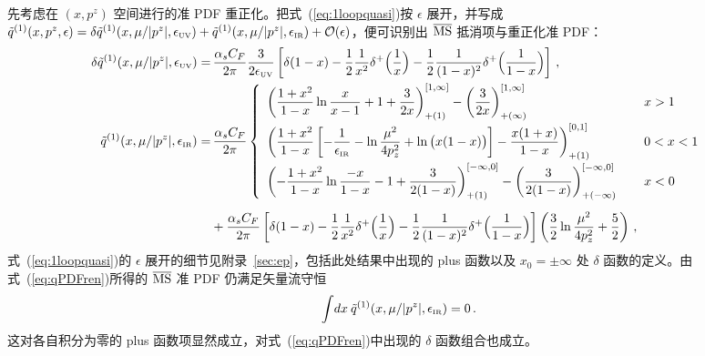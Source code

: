 \begin{widetext}
先考虑在 $(x,p^z)$ 空间进行的准 PDF 重正化。把式~(\ref{eq:1loopquasi})按 $\epsilon$ 展开，并写成 $\tilde{q}^{(1)}(x,p^z,\epsilon) =\delta \tilde{q}^{(1)}(x,\mu/|p^z|,\epsilon_{\mbox{\tiny UV}})+\tilde{q}^{(1)}(x,\mu/|p^z|,\epsilon_{\mbox{\tiny IR}}) +{\cal O}(\epsilon)$，便可识别出 $\overline{\rm MS}$ 抵消项与重正化准 PDF：
\begin{align}\label{eq:qPDFren}
\delta \tilde{q}^{(1)}(x,\mu/|p^z|,\epsilon_{\mbox{\tiny UV}})
=&\,  {\alpha_sC_F\over 2\pi} {3\over 2\epsilon_{\mbox{\tiny UV}}}
 \left[\delta(1-x) - {1\over2}{1\over x^2}\delta^+\Big({1\over x}\Big) - {1\over2}{1\over (1-x)^2}\delta^+\Big({1\over 1-x}\Big) \right]
 \,, \\
\tilde{q}^{(1)}(x,\mu/|p^z|,\epsilon_{\mbox{\tiny IR}})
=&\, {\alpha_sC_F\over 2\pi}\left\{
\begin{array}{ll}
\displaystyle \left({1+x^2\over 1-x}\ln {x\over x-1} + 1 + {3\over 2x}\right)^{[1,\infty]}_{+(1)}- \left({3\over 2x}\right)^{[1,\infty]}_{+(\infty)} &\, x>1\\[10pt]
\displaystyle \left({1+x^2\over 1-x}\left[- {1\over \epsilon_{\mbox{\tiny IR}}} - \ln{\mu^2\over 4p_z^2} + \ln\big(x(1-x)\big)\right] - {x(1+x)\over 1-x}\right)^{[0,1]}_{+(1)}  &\, 0<x<1\\[10pt]
\displaystyle  \left(-{1+x^2\over 1-x}\ln {-x\over 1-x} - 1 + {3\over 2(1-x)}\right)^{[-\infty,0]}_{+(1)} - \left({3\over 2(1-x)}\right)^{[-\infty,0]}_{+(-\infty)} \quad &\, x<0
\end{array}\right.\nonumber\\[5pt]
& + {\alpha_sC_F\over 2\pi}\left[\delta(1-x) - {1\over2}{1\over x^2}\delta^+\Big({1\over x}\Big) - {1\over2}{1\over (1-x)^2}\delta^+\Big({1\over 1-x}\Big) \right] \left( {3\over2}\ln{\mu^2\over 4p_z^2} + {5\over2}\right)
 \,,\nonumber
\end{align}
式~(\ref{eq:1loopquasi})的 $\epsilon$ 展开的细节见附录~\ref{sec:ep}，包括此处结果中出现的 plus 函数以及 $x_0=\pm \infty$ 处 $\delta$ 函数的定义。由式~(\ref{eq:qPDFren})所得的 $\overline{\rm MS}$ 准 PDF 仍满足矢量流守恒
\begin{align} \label{eq:qpdfconsrv}
 \int\! dx\: \tilde{q}^{(1)}(x,\mu/|p^z|,\epsilon_{\mbox{\tiny IR}})  =0 \,.
\end{align}
这对各自积分为零的 plus 函数项显然成立，对式~(\ref{eq:qPDFren})中出现的 $\delta$ 函数组合也成立。


\end{widetext}
